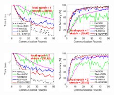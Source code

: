 \documentclass[sigconf, anonymous, review]{acmart}
\begin{document}
\begin{figure}[H]
	\begin{center}
		\mbox{\hspace{-0.15in}			   
		\includegraphics[width=0.25\textwidth]{MNIST_figures/local1_sketch20_iid0_train_loss.eps} \hspace{-0.12in}
		\includegraphics[width=0.25\textwidth]{MNIST_figures/local1_sketch20_iid0_test_acc.eps} 
		}
		
		\mbox{\hspace{-0.15in}			   
		\includegraphics[width=0.25\textwidth]{MNIST_figures/local2_sketch20_iid0_train_loss.eps} \hspace{-0.12in}
		\includegraphics[width=0.25\textwidth]{MNIST_figures/local2_sketch20_iid0_test_acc.eps} 
		}
		

\end{center}
\end{figure}
\end{document}

